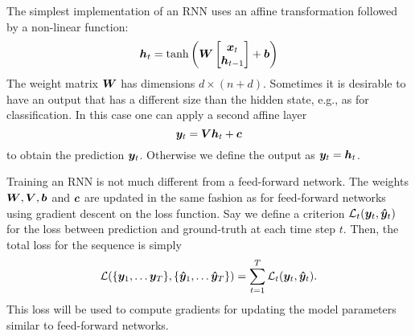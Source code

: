 		The simplest implementation of an RNN uses an affine transformation followed by a non-linear function:
		\begin{equation}
			\bm{h}_t = 
			\tanh \left(
			\bm{W}
			\begin{bmatrix}
				\bm{x}_t \\
				\bm{h}_{t-1}
			\end{bmatrix}
			+ \bm{b}
			\right)
		\end{equation}
		The weight matrix $\bm{W}$ has dimensions $d \times (n + d)$.
		Sometimes it is desirable to have an output that has a different size than the hidden state, e.g., as for classification.
		In this case one can apply a second affine layer
		\begin{equation}
			\bm{y}_t = \bm{V} \bm{h}_t + \bm{c}
		\end{equation}
		to obtain the prediction $\bm{y}_t$.
		Otherwise we define the output as $\bm{y}_t = \bm{h}_t$.
		
		Training an RNN is not much different from a feed-forward network.
		The weights $\bm{W}, \bm{V}, \bm{b}$ and $\bm{c}$ are updated in the same fashion as for feed-forward networks using gradient descent on the loss function.
		Say we define a criterion $\mathcal{L}_t(\bm{y}_t, \bm{\hat{y}}_t)$ for the loss between prediction and ground-truth at each time step $t$.
		Then, the total loss for the sequence is simply 
		\begin{equation}\label{eq:loss_for_rnn}
			\mathcal{L}(\{\vectr{y}_1, \dots \vectr{y}_T\}, \{\vectr{\hat{y}}_1, \dots \vectr{\hat{y}}_T\}) = 
			\sum_{t=1}^{T} \mathcal{L}_t(\vectr{y}_t, \vectr{\hat{y}}_t).
		\end{equation}
		This loss will be used to compute gradients for updating the model parameters similar to feed-forward networks.
		

